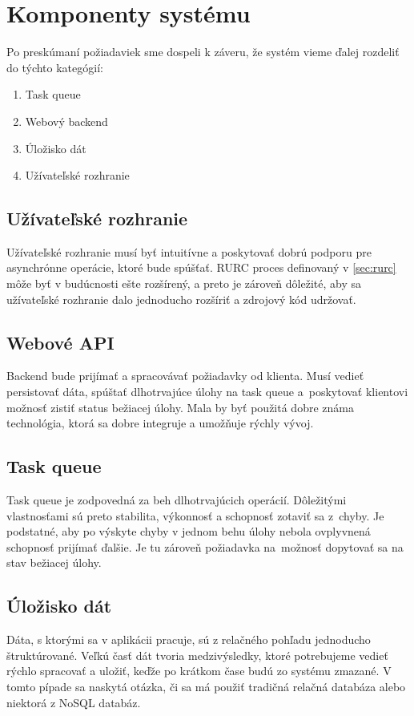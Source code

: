 \section{Komponenty systému}
Po preskúmaní požiadaviek sme dospeli k záveru, že systém vieme ďalej rozdeliť do týchto kategógií:

\begin{enumerate}
  \item Task queue
  \item Webový backend
  \item Úložisko dát
  \item Užívateľské rozhranie
\end{enumerate}

\subsection{Užívateľské rozhranie}
Užívateľské rozhranie musí byť intuitívne a poskytovať dobrú podporu pre asynchrónne operácie, ktoré bude spúšťať. RURC proces definovaný v \ref{sec:rurc} môže byť v budúcnosti ešte rozšírený, a preto je zároveň dôležité, aby sa užívateľské rozhranie dalo jednoducho rozšíriť a zdrojový kód udržovať.

\subsection{Webové API}
Backend bude prijímať a spracovávať požiadavky od klienta. Musí vedieť persistovať dáta, spúštať dlhotrvajúce úlohy na task queue a~pos\-kytovať klientovi možnosť zistiť status bežiacej úlohy. Mala by byť použitá dobre známa technológia, ktorá sa dobre integruje a umožňuje rýchly vývoj.

\subsection{Task queue}
Task queue je zodpovedná za beh dlhotrvajúcich operácií. Dôležitými vlastnosťami sú preto stabilita, výkonnosť a schopnosť zotaviť sa z~chy\-by. Je podstatné, aby po výskyte chyby v jednom behu úlohy nebola ovplyvnená schopnosť prijímať ďalšie. Je tu zároveň požiadavka na~mož\-nosť dopytovať sa na stav bežiacej úlohy.

\subsection{Úložisko dát}
Dáta, s ktorými sa v aplikácii pracuje, sú z relačného pohľadu jednoducho štruktúrované. Veľkú časť dát tvoria medzivýsledky, ktoré potrebujeme vedieť rýchlo spracovať a uložiť, keďže po krátkom čase budú zo systému zmazané. V tomto pípade sa naskytá otázka, či sa má použiť tradičná relačná databáza alebo niektorá z NoSQL databáz. 

